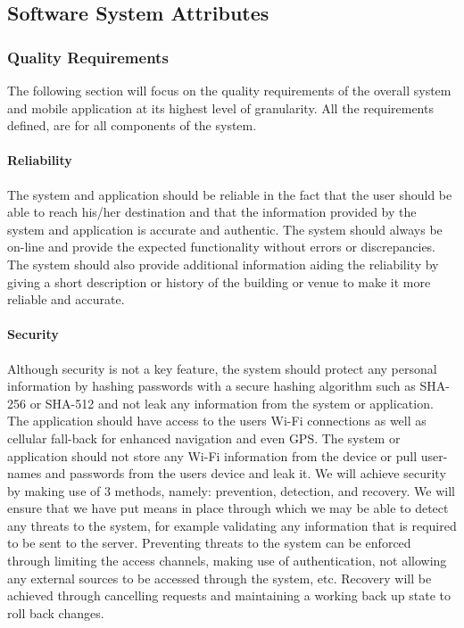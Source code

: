 \documentclass[runningheads,a4paper]{llncs}
\begin{document}
 \subsection{Software System Attributes}
\subsubsection{Quality Requirements \\}
The following section will focus on the quality requirements of the overall system and mobile application at its highest level of granularity. All the requirements defined, are for all components of the system.

\paragraph{\textbf{Reliability} \\}
The system and application should be reliable in the fact that the user should be able to reach his/her destination and that the information provided by the system and application is accurate and authentic. The system should always be on-line and provide the expected functionality without errors or discrepancies. The system should also provide additional information aiding the reliability by giving a short description or history of the building or venue to make it more reliable and accurate. 

\paragraph{\textbf{Security} \\}
Although security is not a key feature, the system should protect any personal information by hashing passwords with a secure hashing algorithm such as SHA-256 or SHA-512 and not leak any information from the system or application. The application should have access to the users Wi-Fi connections as well as cellular fall-back for enhanced navigation and even GPS. The system or application should not store any Wi-Fi information from the device or pull user-names and passwords from the users device and leak it.
We will achieve security by making use of 3 methods, namely: prevention, detection, and recovery. We will ensure that we have put means in
place through which we may be able to detect any threats to the system,
for example validating any information that is required to be sent to the
server. Preventing threats to the system can be enforced through limiting the access channels, making use of authentication, not allowing any
external sources to be accessed through the system, etc. Recovery will be
achieved through cancelling requests and maintaining a working back up
state to roll back changes.  
\end{document}
